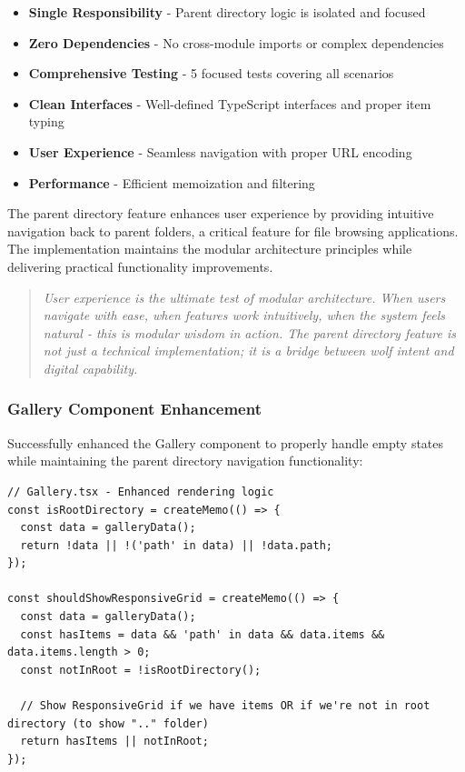 \documentclass[11pt]{article}
\begin{document}
\begin{itemize}
\item \textbf{Single Responsibility} - Parent directory logic is isolated and focused
\item \textbf{Zero Dependencies} - No cross-module imports or complex dependencies
\item \textbf{Comprehensive Testing} - 5 focused tests covering all scenarios
\item \textbf{Clean Interfaces} - Well-defined TypeScript interfaces and proper item typing
\item \textbf{User Experience} - Seamless navigation with proper URL encoding
\item \textbf{Performance} - Efficient memoization and filtering
\end{itemize}

The parent directory feature enhances user experience by providing intuitive navigation back to parent folders, a critical feature for file browsing applications. The implementation maintains the modular architecture principles while delivering practical functionality improvements.

\begin{quote}
\emph{User experience is the ultimate test of modular architecture. When users navigate with ease, when features work intuitively, when the system feels natural - this is modular wisdom in action. The parent directory feature is not just a technical implementation; it is a bridge between wolf intent and digital capability.}
\end{quote}

\subsubsection{Gallery Component Enhancement}

Successfully enhanced the Gallery component to properly handle empty states while maintaining the parent directory navigation functionality:

\begin{lstlisting}[style=typescript]
// Gallery.tsx - Enhanced rendering logic
const isRootDirectory = createMemo(() => {
  const data = galleryData();
  return !data || !('path' in data) || !data.path;
});

const shouldShowResponsiveGrid = createMemo(() => {
  const data = galleryData();
  const hasItems = data && 'path' in data && data.items && data.items.length > 0;
  const notInRoot = !isRootDirectory();
  
  // Show ResponsiveGrid if we have items OR if we're not in root directory (to show ".." folder)
  return hasItems || notInRoot;
});
\end{lstlisting}
\end{document}
